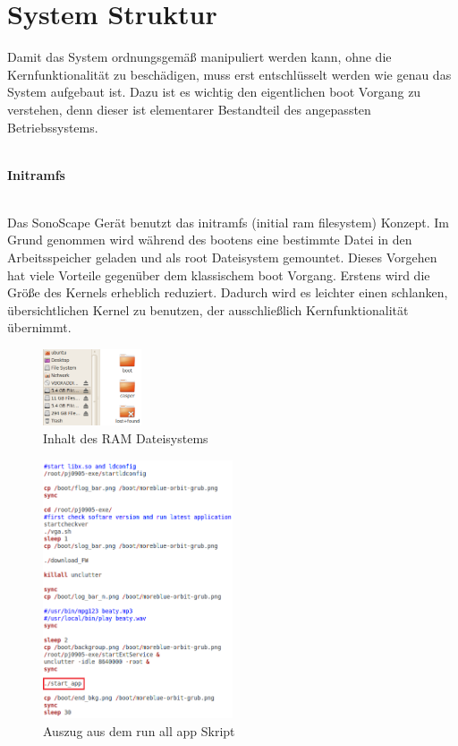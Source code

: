 \section{System Struktur}
Damit das System ordnungsgemäß manipuliert werden kann, ohne die Kernfunktionalität zu beschädigen, muss erst entschlüsselt werden wie genau das System aufgebaut ist. Dazu ist es wichtig den eigentlichen boot Vorgang zu verstehen, denn dieser ist elementarer Bestandteil des angepassten Betriebssystems.\\\\
\begin{large}
\textbf{Initramfs}\\\\
\end{large}
Das SonoScape Gerät benutzt das initramfs (initial ram filesystem) Konzept. Im Grund genommen wird während des bootens eine bestimmte Datei in den Arbeitsspeicher geladen und als root Dateisystem gemountet. Dieses Vorgehen hat viele Vorteile gegenüber dem klassischem boot Vorgang. Erstens wird die Größe des Kernels erheblich reduziert. Dadurch wird es leichter einen schlanken, übersichtlichen Kernel zu benutzen, der ausschließlich Kernfunktionalität übernimmt. 
\begin{figure}
\centering
\includegraphics*[width =0.26\textwidth]{Sonoscape_Analyse/initramfs}
\caption{{\small Inhalt des RAM Dateisystems}}
\label{fig:RAM_Dateisystem}
\end{figure} 
\begin{figure}[h]
	\centering
	\includegraphics[width=0.5\textwidth]{Sonoscape_Analyse/run_all_app}
	\caption{Auszug aus dem run all app Skript}
	\label{fig:run_all_app}
\end{figure}
